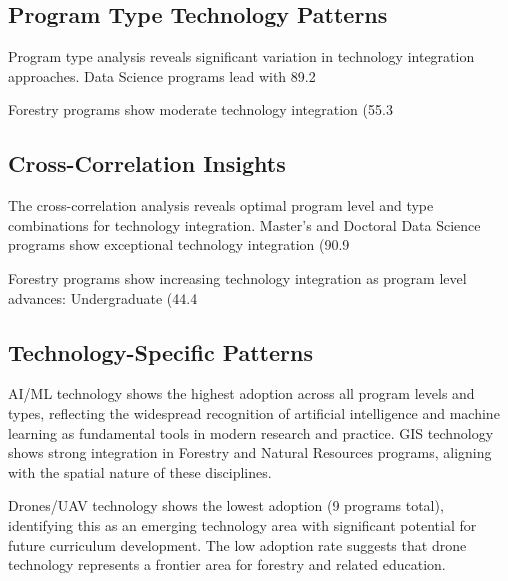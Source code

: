 \documentclass[12pt]{article}
\begin{document}
\subsection{Program Type Technology Patterns}
Program type analysis reveals significant variation in technology integration approaches. Data Science programs lead with 89.2%

Forestry programs show moderate technology integration (55.3%

\subsection{Cross-Correlation Insights}
The cross-correlation analysis reveals optimal program level and type combinations for technology integration. Master's and Doctoral Data Science programs show exceptional technology integration (90.9%

Forestry programs show increasing technology integration as program level advances: Undergraduate (44.4%

\subsection{Technology-Specific Patterns}
AI/ML technology shows the highest adoption across all program levels and types, reflecting the widespread recognition of artificial intelligence and machine learning as fundamental tools in modern research and practice. GIS technology shows strong integration in Forestry and Natural Resources programs, aligning with the spatial nature of these disciplines.

Drones/UAV technology shows the lowest adoption (9 programs total), identifying this as an emerging technology area with significant potential for future curriculum development. The low adoption rate suggests that drone technology represents a frontier area for forestry and related education.
\end{document}
